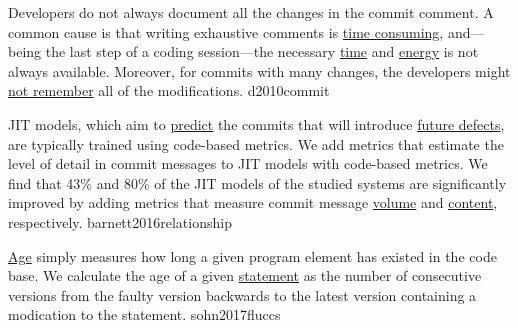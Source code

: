 \documentclass{article}
\begin{document}
  {Developers do not always document all the changes in the commit comment. A common cause is that writing exhaustive comments is \ul{time consuming}, and---being the last step of a coding session---the necessary \ul{time} and \ul{energy} is not always available. Moreover, for commits with many changes, the developers might \ul{not remember} all of the modifications.}
  {d2010commit}

  {JIT models, which aim to \ul{predict} the commits that will introduce \ul{future defects}, are typically trained using code-based metrics. We add metrics that estimate the level of detail in commit messages to JIT models with code-based metrics. We find that 43\% and 80\% of the JIT models of the studied systems are significantly improved by adding metrics that measure commit message \ul{volume} and \ul{content}, respectively.}
  {barnett2016relationship}

  {\ul{Age} simply measures how long a given program element has existed in the code base. We calculate the age of a given \ul{statement} as the number of consecutive versions from the faulty version backwards to the latest version containing a modication to the statement.}
  {sohn2017fluccs}
\end{document}
